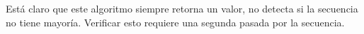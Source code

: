  Está claro que este algoritmo siempre retorna un valor,
  no detecta si la secuencia no tiene mayoría.
  Verificar esto requiere una segunda pasada por la secuencia.




